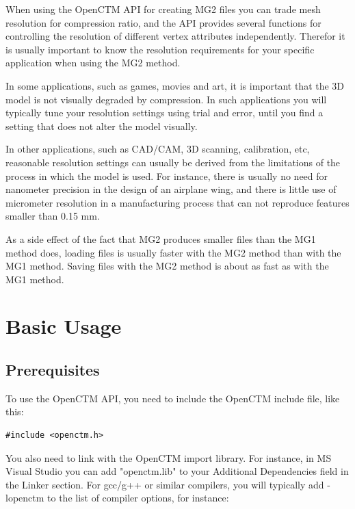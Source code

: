 When using the OpenCTM API for creating MG2 files you can trade mesh resolution
for compression ratio, and the API provides several functions for controlling
the resolution of different vertex attributes independently. Therefor it is
usually important to know the resolution requirements for your specific
application when using the MG2 method.

In some applications, such as games, movies and art, it is important that the
3D model is not visually degraded by compression. In such applications
you will typically tune your resolution settings using trial and error,
until you find a setting that does not alter the model visually.

In other applications, such as CAD/CAM, 3D scanning, calibration, etc,
reasonable resolution settings can usually be derived from the limitations
of the process in which the model is used. For instance, there is usually no
need for nanometer precision in the design of an airplane wing, and there
is little use of micrometer resolution in a manufacturing process that can
not reproduce features smaller than 0.15 mm.

As a side effect of the fact that MG2 produces smaller files than the MG1
method does, loading files is usually faster with the MG2 method than with
the MG1 method. Saving files with the MG2 method is about as fast as with
the MG1 method.




\chapter{Basic Usage}

\section{Prerequisites}
To use the OpenCTM API, you need to include the OpenCTM include file, like this:

\begin{lstlisting}
#include <openctm.h>
\end{lstlisting}

You also need to link with the OpenCTM import library. For instance, in MS
Visual Studio you can add "openctm.lib" to your Additional Dependencies field
in the Linker section. For gcc/g++ or similar compilers, you will typically
add -lopenctm to the list of compiler options, for instance:

